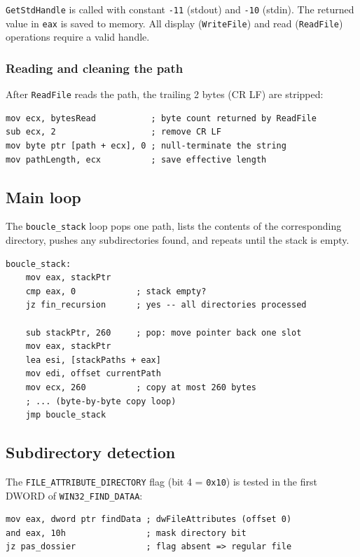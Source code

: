 \documentclass[12pt,a4paper]{article}
\begin{document}
\texttt{GetStdHandle} is called with constant \texttt{-11} (stdout) and \texttt{-10} (stdin). The returned value in \texttt{eax} is saved to memory. All display (\texttt{WriteFile}) and read (\texttt{ReadFile}) operations require a valid handle.

\subsubsection{Reading and cleaning the path}

After \texttt{ReadFile} reads the path, the trailing 2 bytes (CR LF) are stripped:

\begin{lstlisting}
mov ecx, bytesRead           ; byte count returned by ReadFile
sub ecx, 2                   ; remove CR LF
mov byte ptr [path + ecx], 0 ; null-terminate the string
mov pathLength, ecx          ; save effective length
\end{lstlisting}

\subsection{Main loop}

The \texttt{boucle\_stack} loop pops one path, lists the contents of the corresponding directory, pushes any subdirectories found, and repeats until the stack is empty.

\begin{lstlisting}
boucle_stack:
    mov eax, stackPtr
    cmp eax, 0            ; stack empty?
    jz fin_recursion      ; yes -- all directories processed

    sub stackPtr, 260     ; pop: move pointer back one slot
    mov eax, stackPtr
    lea esi, [stackPaths + eax]
    mov edi, offset currentPath
    mov ecx, 260          ; copy at most 260 bytes
    ; ... (byte-by-byte copy loop)
    jmp boucle_stack
\end{lstlisting}

\subsection{Subdirectory detection}

The \texttt{FILE\_ATTRIBUTE\_DIRECTORY} flag (bit 4 = \texttt{0x10}) is tested in the first DWORD of \texttt{WIN32\_FIND\_DATAA}:

\begin{lstlisting}
mov eax, dword ptr findData ; dwFileAttributes (offset 0)
and eax, 10h                ; mask directory bit
jz pas_dossier              ; flag absent => regular file
\end{lstlisting}
\end{document}
